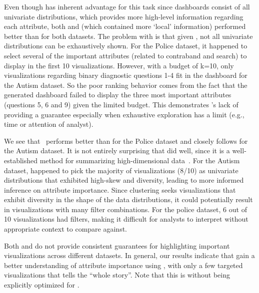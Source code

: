 \par Even though \BFS has inherent advantage for this task since \BFS dashboards consist of all univariate distributions, which provides more high-level information regarding each attribute, both \system and \cluster (which contained more `local' information) performed better than \BFS for both datasets. The problem with \BFS is that given , not all univariate distributions can be exhaustively shown. For the Police dataset, it happened to select several of the important attributes (related to contraband and search) to display in the first 10 visualizations. However, with a budget of k=10, only visualizations regarding binary diagnostic questions 1-4 fit in the dashboard for the Autism dataset. So the poor ranking behavior comes from the fact that the \BFS generated dashboard failed to display the three most important attributes (questions 5, 6 and 9) given the limited budget. This demonstrates \BFS's lack of providing a guarantee especially when exhaustive exploration has a limit (e.g., time or attention of analyst).
\par We see that \system\ performs better than \cluster for the Police dataset and closely follows \cluster for the Autism dataset. It is not entirely surprising that \cluster did well, since it is a well-established method for summarizing high-dimensional data~\cite{Han2005}. For the Autism dataset, \cluster happened to pick the majority of visualizations (8/10) as univariate distributions that exhibited high-skew and diversity, leading to more informed inference on attribute importance. Since clustering seeks visualizations that exhibit diversity in the shape of the data distributions, it could potentially result in visualizations with many filter combinations. For the police dataset, 6 out of 10 visualizations had  filters, making it difficult for analysts to interpret  without appropriate context to compare against.
\par Both \BFS and \cluster do not provide consistent guarantees for highlighting important visualizations across different datasets. In general, our results indicate that  gain a better understanding of attribute importance using \system, with only a few targeted visualizations that tells the ``whole story''. Note that this is without \system being explicitly optimized for .

